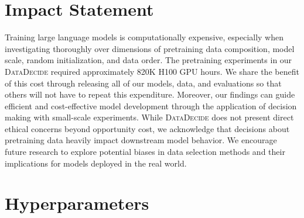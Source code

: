 \documentclass{article}
\theoremstyle{plain}
\theoremstyle{definition}
\theoremstyle{remark}
\newcommand{\numRecipes}{25}
\newcommand{\numScales}{14}
\newcommand{\numTargetSeeds}{3}
\newcommand{\projSuite}{\textsc{DataDecide}}
\begin{document}
\section*{Impact Statement}
Training large language models is computationally expensive, especially when investigating thoroughly over dimensions of pretraining data composition, model scale, random initialization, and data order. The pretraining experiments in our \projSuite{} required approximately 820K H100 GPU hours. We share the benefit of this cost through releasing all of our models, data, and evaluations so that others will not have to repeat this expenditure. Moreover, our findings can guide efficient and cost-effective model development through the application of decision making with small-scale experiments. While \projSuite{} does not present direct ethical concerns beyond opportunity cost, we acknowledge that decisions about pretraining data heavily impact downstream model behavior. We encourage future research to explore potential biases in data selection methods and their implications for models deployed in the real world.







\newpage
\appendix

\section{Hyperparameters}



\begin{table}[]
    \centering
    
    \caption{\projSuite{} uses OLMo's \textit{model ladder} \citep{groeneveld2024olmoacceleratingsciencelanguage, olmo20252olmo2furious, bhagia2024establishingtaskscalinglaws} to programmatically create configurations for \numScales{} model sizes with hyperparameters determined by heuristics in \citet{Porian2024ResolvingDI}. All models have sequence length of 2024 and MLP ratio of 8. Each configuration is pretrained over \numRecipes{} data recipes (Table~\ref{tab:data_recipes}). 
    Each recipe and configuration is also trained for \numTargetSeeds{} random seeds where model sizes $<1$B are stopped early at 25\% of the compute used to train the 1B model for all but the default seed. Model size is number of non-embedding parameters. Batch size is the number of sequences per batch.
    }
    \label{tab:suite_stats}
\end{table}
\end{document}
